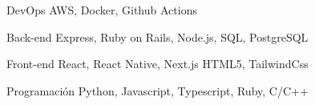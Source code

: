 

\begin{cvskills}

  \cvskill
    {DevOps} %
    {AWS, Docker, Github Actions} %

  \cvskill
    {Back-end} %
    {Express, Ruby on Rails, Node.js, SQL, PostgreSQL} %

  \cvskill
    {Front-end} %
    {React, React Native, Next.js HTML5, TailwindCss} %

  \cvskill
    {Programación} %
    {Python, Javascript, Typescript, Ruby, C/C++} %

\end{cvskills}
